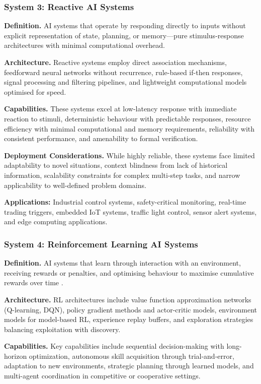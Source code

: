 \documentclass[12pt, a4paper]{article}
\begin{document}
\subsubsection{System 3: Reactive AI Systems}
\textbf{Definition.} AI systems that operate by responding directly to inputs without explicit representation of state, planning, or memory---pure stimulus-response architectures with minimal computational overhead.

\textbf{Architecture.} Reactive systems employ direct association mechanisms, feedforward neural networks without recurrence, rule-based if-then responses, signal processing and filtering pipelines, and lightweight computational models optimised for speed.

\textbf{Capabilities.} These systems excel at low-latency response with immediate reaction to stimuli, deterministic behaviour with predictable responses, resource efficiency with minimal computational and memory requirements, reliability with consistent performance, and amenability to formal verification.

\textbf{Deployment Considerations.} While highly reliable, these systems face limited adaptability to novel situations, context blindness from lack of historical information, scalability constraints for complex multi-step tasks, and narrow applicability to well-defined problem domains.

\textbf{Applications:} Industrial control systems, safety-critical monitoring, real-time trading triggers, embedded IoT systems, traffic light control, sensor alert systems, and edge computing applications.

\subsubsection{System 4: Reinforcement Learning AI Systems}
\textbf{Definition.} AI systems that learn through interaction with an environment, receiving rewards or penalties, and optimising behaviour to maximise cumulative rewards over time \cite{kaelbling1996reinforcement, sutton2018reinforcement}.

\textbf{Architecture.} RL architectures include value function approximation networks (Q-learning, DQN), policy gradient methods and actor-critic models, environment models for model-based RL, experience replay buffers, and exploration strategies balancing exploitation with discovery.

\textbf{Capabilities.} Key capabilities include sequential decision-making with long-horizon optimization, autonomous skill acquisition through trial-and-error, adaptation to new environments, strategic planning through learned models, and multi-agent coordination in competitive or cooperative settings.
\end{document}
